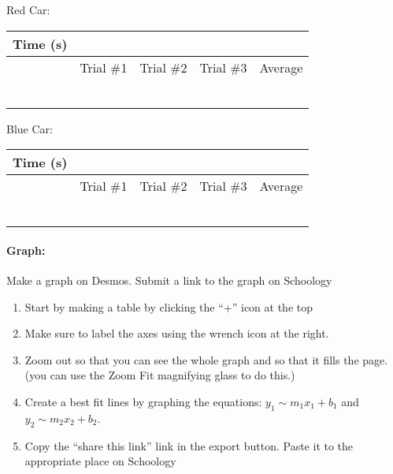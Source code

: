 \documentclass[10pt]{exam}
\begin{document}
  \def\cw{.15\textwidth}
  \newcommand{\datatable}{
    \renewcommand{\arraystretch}{1.65}
    \begin{center}
      \begin{tabular}
        {
          |*{4}{>{\centering\arraybackslash}m{\cw}|}
          |>{\centering\arraybackslash}m{\cw}|
        }
        \hline
        \multirow{2}{\cw}
          {\centering Time (s)} & 
        \multicolumn{4}{c|}{Distance Traveled (m)} \\
        \cline{2-5}
        & Trial \#1 & Trial \#2 & Trial \#3 & Average \\
        \hline
        2 &&&&\\
        \hline
        4 &&&&\\
        \hline
        6 &&&&\\
        \hline
        8 &&&&\\
        \hline
        10 &&&&\\
        \hline
        12 &&&&\\
        \hline
      \end{tabular}
    \end{center}
  }

  \noindent
  Red Car:
  \datatable

  \noindent
  Blue Car:
  \datatable

  \paragraph{Graph:} 
    Make a graph on Desmos.  Submit a link to the graph on Schoology
    
    \begin{enumerate}[label=\alph*),topsep=0pt,itemsep=-1ex,partopsep=1ex,parsep=1ex]
      \item 
        Start by making a table by clicking the “+” icon at the top 
      \item
        Make sure to label the axes using the wrench icon at the right.
      \item
        Zoom out so that you can see the whole graph and so that it fills the page. (you can use the Zoom Fit magnifying glass to do this.)
      \item
        Create a best fit lines by graphing the equations: $y_1 \sim m_1 x_1 + b_1$ and $y_2 \sim m_2 x_2 + b_2$.
      \item
        Copy the “share this link” link in the export button.  Paste it to the appropriate place on Schoology
    \end{enumerate}
\end{document}
